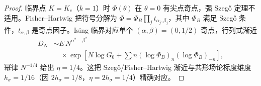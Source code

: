 \begin{proof}
临界点 \(K=K_c\)（\(k=1\)）时 \(\Phi(\theta)\) 在 \(\theta=0\) 有尖点奇点，强 Szegő 定理不适用。Fisher--Hartwig 把符号分解为 \(\Phi=\Phi_B\prod_j t_{\alpha_j,\beta_j}\)，其中 \(\Phi_B\) 满足 Szegő 条件，\(t_{\alpha,\beta}\) 是奇点因子。Ising 临界对应单个 \((\alpha,\beta)=(0,1/2)\) 奇点，行列式渐近
\begin{align*}
  D_N
  &\sim E\,N^{\alpha^2-\beta^2}
  \\
  &\quad{}\times\exp\!\left[
    N\log G_0+\sum n(\log\Phi_B)_n(\log\Phi_B)_{-n}
  \right],
\end{align*}
幂律 \(N^{-1/4}\) 给出 \(\eta=1/4\)。这把 Szegő/Fisher--Hartwig 渐近与共形场论标度维度 \(h_\sigma=1/16\)（因 \(2h_\sigma=1/8\)，\(\eta=2h_\sigma=1/4\)）精确对应。
\end{proof}
